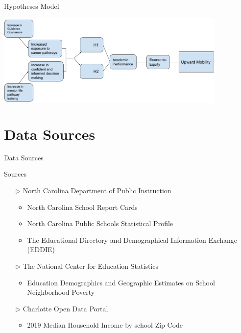 \documentclass[10pt]{beamer}
\begin{document}
\begin{frame}[fragile]{Hypotheses Model}

    \includegraphics[width=11.4cm]{Hypothesis_Modelv2.png}

\end{frame}


\section[Data Sources]{Data Sources}

\begin{frame}{Data Sources}
    \fontsize{11pt}{7.2}
    \begin{exampleblock}{Sources}
        \begin{itemize}
            \setlength\itemsep{3mm}
            \item[$\triangleright$] North Carolina Department of Public Instruction
                \begin{itemize}
                    \item North Carolina School Report Cards
                    \item North Carolina Public Schools Statistical Profile
                    \item The Educational Directory and Demographical Information Exchange (EDDIE)
                \end{itemize}
            \item[$\triangleright$] The National Center for Education Statistics 
                \begin{itemize}
                    \item Education Demographics and Geographic Estimates on School Neighborhood Poverty
                \end{itemize}
            \item[$\triangleright$] Charlotte Open Data Portal
                \begin{itemize}
                    \item 2019 Median Household Income by school Zip Code
                \end{itemize}
        \end{itemize}
    \end{exampleblock}

\end{frame}
\end{document}
